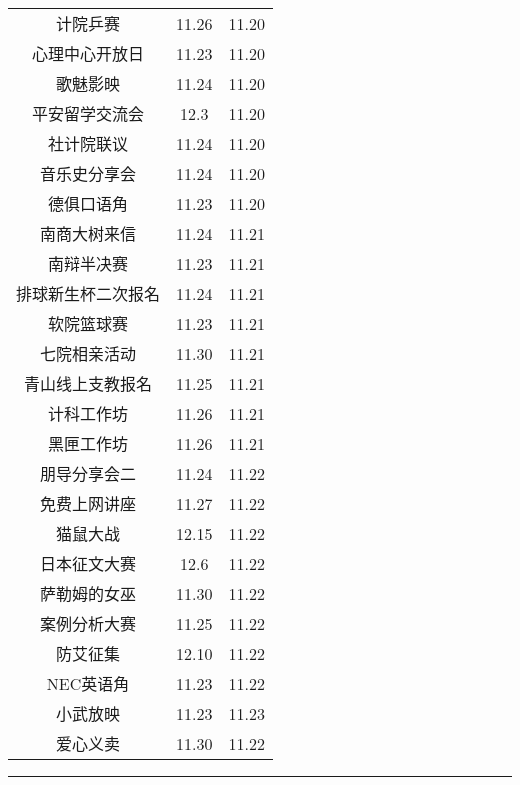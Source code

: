 \documentclass[letterpaper, 12pt]{article}
\begin{document}
\begin{multicols}{2}
{\begin{longtable}{|c|c|c|}
    计院乒赛 & 11.26 & 11.20\\
    心理中心开放日 & 11.23 & 11.20\\
    歌魅影映 & 11.24 & 11.20\\
    平安留学交流会 & 12.3 & 11.20\\
    社计院联议 & 11.24 & 11.20\\
    音乐史分享会 & 11.24 & 11.20\\
    德俱口语角 & 11.23 & 11.20\\
    南商大树来信 & 11.24 & 11.21\\
    南辩半决赛 & 11.23 & 11.21\\
    排球新生杯二次报名 & 11.24 & 11.21\\
    软院篮球赛 & 11.23 & 11.21\\
    七院相亲活动 & 11.30 & 11.21\\
    青山线上支教报名 & 11.25 & 11.21\\
    计科工作坊 & 11.26 & 11.21\\
    黑匣工作坊 & 11.26 & 11.21\\
    朋导分享会二 & 11.24 & 11.22\\
    免费上网讲座 & 11.27 & 11.22\\
    猫鼠大战 & 12.15 & 11.22\\
    日本征文大赛 & 12.6 & 11.22\\
    萨勒姆的女巫 & 11.30 & 11.22\\
    案例分析大赛 & 11.25 & 11.22\\
    防艾征集 & 12.10 & 11.22\\
    NEC英语角 & 11.23 & 11.22\\
    小武放映 & 11.23 & 11.23\\
    爱心义卖 & 11.30 & 11.22\\
    \hline
\end{longtable}
\unskip
\unpenalty
\unpenalty}\unvbox\colbbox
\end{multicols}
\hrule
\pagebreak
\end{document}

